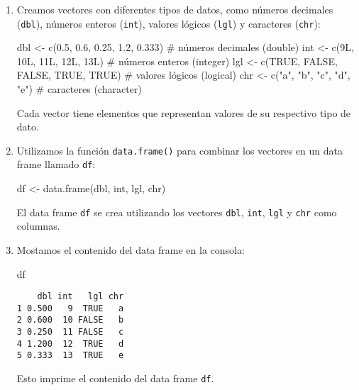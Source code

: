 \documentclass[
  a4paper,
]{article}
\newenvironment{Shaded}{}{}
\newcommand{\CommentTok}[1]{\textcolor[rgb]{0.42,0.45,0.49}{#1}}
\newcommand{\ConstantTok}[1]{\textcolor[rgb]{0.00,0.36,0.77}{#1}}
\newcommand{\FloatTok}[1]{\textcolor[rgb]{0.00,0.36,0.77}{#1}}
\newcommand{\FunctionTok}[1]{\textcolor[rgb]{0.44,0.26,0.76}{#1}}
\newcommand{\NormalTok}[1]{\textcolor[rgb]{0.14,0.16,0.18}{#1}}
\newcommand{\OtherTok}[1]{\textcolor[rgb]{0.44,0.26,0.76}{#1}}
\newcommand{\StringTok}[1]{\textcolor[rgb]{0.01,0.18,0.38}{#1}}
\begin{document}
\begin{enumerate}
\def\labelenumi{\arabic{enumi}.}
\item
  Creamos vectores con diferentes tipos de datos, como números decimales
  (\texttt{dbl}), números enteros (\texttt{int}), valores lógicos
  (\texttt{lgl}) y caracteres (\texttt{chr}):

\begin{Shaded}
\begin{Highlighting}[]
\NormalTok{dbl }\OtherTok{\textless{}{-}} \FunctionTok{c}\NormalTok{(}\FloatTok{0.5}\NormalTok{, }\FloatTok{0.6}\NormalTok{, }\FloatTok{0.25}\NormalTok{, }\FloatTok{1.2}\NormalTok{, }\FloatTok{0.333}\NormalTok{) }\CommentTok{\# números decimales (double)}
\NormalTok{int }\OtherTok{\textless{}{-}} \FunctionTok{c}\NormalTok{(9L, 10L, 11L, 12L, 13L) }\CommentTok{\# números enteros (integer)}
\NormalTok{lgl }\OtherTok{\textless{}{-}} \FunctionTok{c}\NormalTok{(}\ConstantTok{TRUE}\NormalTok{, }\ConstantTok{FALSE}\NormalTok{, }\ConstantTok{FALSE}\NormalTok{, }\ConstantTok{TRUE}\NormalTok{, }\ConstantTok{TRUE}\NormalTok{) }\CommentTok{\# valores lógicos (logical)}
\NormalTok{chr }\OtherTok{\textless{}{-}} \FunctionTok{c}\NormalTok{(}\StringTok{"a"}\NormalTok{, }\StringTok{"b"}\NormalTok{, }\StringTok{"c"}\NormalTok{, }\StringTok{"d"}\NormalTok{, }\StringTok{"e"}\NormalTok{) }\CommentTok{\# caracteres (character)}
\end{Highlighting}
\end{Shaded}

  Cada vector tiene elementos que representan valores de su respectivo
  tipo de dato.
\item
  Utilizamos la función \texttt{data.frame()} para combinar los vectores
  en un data frame llamado \texttt{df}:

\begin{Shaded}
\begin{Highlighting}[]
\NormalTok{df }\OtherTok{\textless{}{-}} \FunctionTok{data.frame}\NormalTok{(dbl, int, lgl, chr)}
\end{Highlighting}
\end{Shaded}

  El data frame \texttt{df} se crea utilizando los vectores
  \texttt{dbl}, \texttt{int}, \texttt{lgl} y \texttt{chr} como columnas.
\item
  Mostamos el contenido del data frame en la consola:

\begin{Shaded}
\begin{Highlighting}[]
\NormalTok{df}
\end{Highlighting}
\end{Shaded}

\begin{verbatim}
    dbl int   lgl chr
1 0.500   9  TRUE   a
2 0.600  10 FALSE   b
3 0.250  11 FALSE   c
4 1.200  12  TRUE   d
5 0.333  13  TRUE   e
\end{verbatim}

  Esto imprime el contenido del data frame \texttt{df}.
\end{enumerate}
\end{document}
